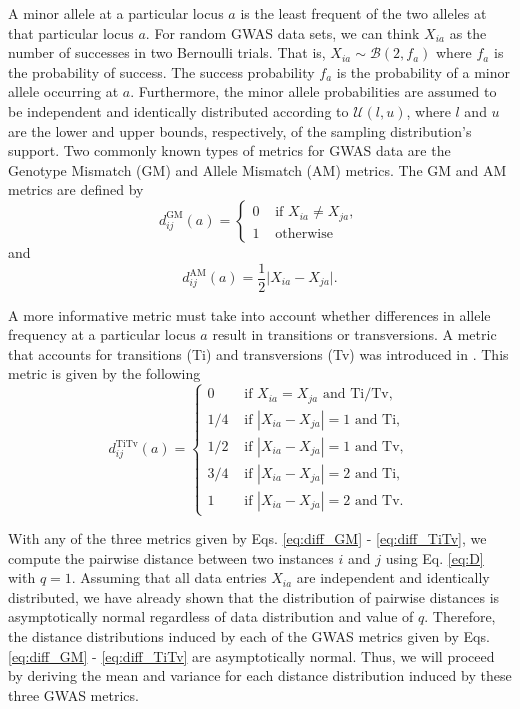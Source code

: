 \documentclass[10pt,letterpaper]{article}\usepackage[]{graphicx}\usepackage[]{color}
\begin{document}
A minor allele at a particular locus $a$ is the least frequent of the two alleles at that particular locus $a$. For random GWAS data sets, we can think $X_{ia}$ as the number of successes in two Bernoulli trials. That is, $X_{ia} \sim \mathcal{B}(2,f_a)$ where $f_a$ is the probability of success. The success probability $f_a$ is the probability of a minor allele occurring at $a$. Furthermore, the minor allele probabilities are assumed to be independent and identically distributed according to $\mathcal{U}(l,u)$, where $l$ and $u$ are the lower and upper bounds, respectively, of the sampling distribution's support. Two commonly known types of metrics for GWAS data are the Genotype Mismatch (GM) and Allele Mismatch (AM) metrics. The GM and AM metrics are defined by
%
\begin{equation}\label{eq:diff_GM}
d^\text{GM}_{ij}(a) = \begin{cases} 
0 & \text{ if } X_{ia} \neq X_{ja}, \\
1 & \text{ otherwise}
\end{cases}
\end{equation}
%
and
%
\begin{equation}\label{eq:diff_AM}
d^\text{AM}_{ij}(a) = \frac{1}{2}\bigl|X_{ia} - X_{ja}\bigr|.
\end{equation}

A more informative metric must take into account whether differences in allele frequency at a particular locus $a$ result in transitions or transversions. A metric that accounts for transitions (Ti) and transversions (Tv) was introduced in \cite{arabnejad2018}. This metric is given by the following
%
\begin{equation}\label{eq:diff_TiTv}
d^\text{TiTv}_{ij}(a) = \begin{cases}
0 & \text{ if } X_{ia} = X_{ja} \text{ and Ti/Tv}, \\
1/4 & \text{ if } |X_{ia} - X_{ja}|=1 \text{ and Ti}, \\
1/2 & \text{ if } |X_{ia} - X_{ja}|=1 \text{ and Tv}, \\
3/4 & \text{ if } |X_{ia} - X_{ja}|=2 \text{ and Ti}, \\
1 & \text{ if } |X_{ia} - X_{ja}|=2 \text{ and Tv}.
\end{cases}
\end{equation}

With any of the three metrics given by Eqs. \ref{eq:diff_GM} - \ref{eq:diff_TiTv}, we compute the pairwise distance between two instances $i$ and $j$ using Eq. \ref{eq:D} with $q=1$. Assuming that all data entries $X_{ia}$ are independent and identically distributed, we have already shown that the distribution of pairwise distances is asymptotically normal regardless of data distribution and value of $q$. Therefore, the distance distributions induced by each of the GWAS metrics given by Eqs. \ref{eq:diff_GM} - \ref{eq:diff_TiTv} are asymptotically normal. Thus, we will proceed by deriving the mean and variance for each distance distribution induced by these three GWAS metrics. 
\end{document}
